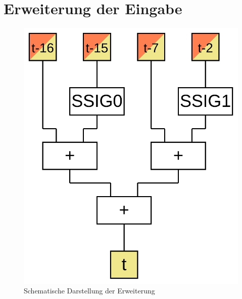 \section{Erweiterung der Eingabe}


\begin{figure}[ht]
  \centering
  \includegraphics[scale=0.4]{images/sha256prep}
  \caption{Schematische Darstellung der Erweiterung}
  \label{fig:sha256prep}
\end{figure}